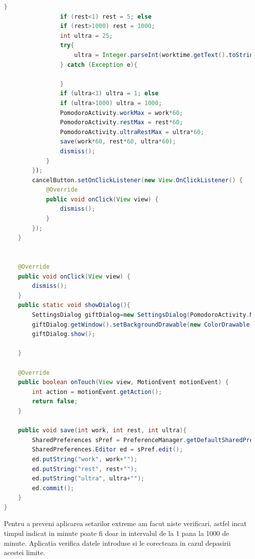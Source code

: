 \documentclass[12pt]{article}
\begin{document}
\begin{lstlisting}[language=java, caption={Fisierul settings\_dialog.xml}, label=list2]
                }
                if (rest<1) rest = 5; else
                if (rest>1000) rest = 1000;
                int ultra = 25;
                try{
                    ultra = Integer.parseInt(worktime.getText().toString());
                } catch (Exception e){

                }
                if (ultra<1) ultra = 1; else
                if (ultra>1000) ultra = 1000;
                PomodoroActivity.workMax = work*60;
                PomodoroActivity.restMax = rest*60;
                PomodoroActivity.ultraRestMax = ultra*60;
                save(work*60, rest*60, ultra*60);
                dismiss();
            }
        });
        cancelButton.setOnClickListener(new View.OnClickListener() {
            @Override
            public void onClick(View view) {
                dismiss();
            }
        });
    }


    @Override
    public void onClick(View view) {
        dismiss();
    }
    public static void showDialog(){
        SettingsDialog giftDialog=new SettingsDialog(PomodoroActivity.MainScreen);
        giftDialog.getWindow().setBackgroundDrawable(new ColorDrawable(android.graphics.Color.TRANSPARENT));
        giftDialog.show();

    }

    @Override
    public boolean onTouch(View view, MotionEvent motionEvent) {
        int action = motionEvent.getAction();
        return false;
    }

    public void save(int work, int rest, int ultra){
        SharedPreferences sPref = PreferenceManager.getDefaultSharedPreferences(getContext());
        SharedPreferences.Editor ed = sPref.edit();
        ed.putString("work", work+"");
        ed.putString("rest", rest+"");
        ed.putString("ultra", ultra+"");
        ed.commit();
    }
}


\end{lstlisting}
Pentru a preveni aplicarea setarilor extreme am facut niste verificari, astfel incat timpul indicat in minute poate fi doar in intervalul de la 1 pana la 1000 de minute. Aplicatia verifica datele introduse si le corecteaza in cazul depasirii acestei limite.
\end{document}
